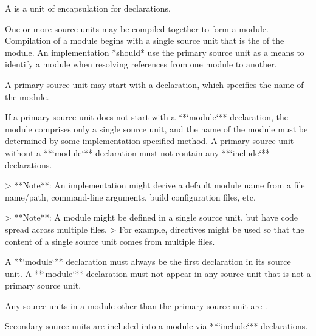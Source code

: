 
A  is a unit of encapsulation for declarations.


One or more source units may be compiled together to form a module.
Compilation of a module begins with a single source unit that is the  of the module.
An implementation *should* use the primary source unit as a means to identify a module when resolving references from one module to another.

A primary source unit may start with a  declaration, which specifies the name of the module.

\begin{Syntax}
      \code{;}
\end{Syntax}

If a primary source unit does not start with a **`module`** declaration, the module comprises only a single source unit, and the name of the module must be determined by some implementation-specified method.
A primary source unit without a **`module`** declaration must not contain any **`include`** declarations.

> **Note**: An implementation might derive a default module name from a file name/path, command-line arguments, build configuration files, etc.

> **Note**: A module might be defined in a single source unit, but have code spread across multiple files.
> For example,  directives might be used so that the content of a single source unit comes from multiple files.

A **`module`** declaration must always be the first declaration in its source unit.
A **`module`** declaration must not appear in any source unit that is not a primary source unit.


Any source units in a module other than the primary source unit are .


Secondary source units are included into a module via **`include`** declarations.

\begin{Syntax}
          \code{;}
    \SynOr  {}  \code{;}
\end{Syntax}

